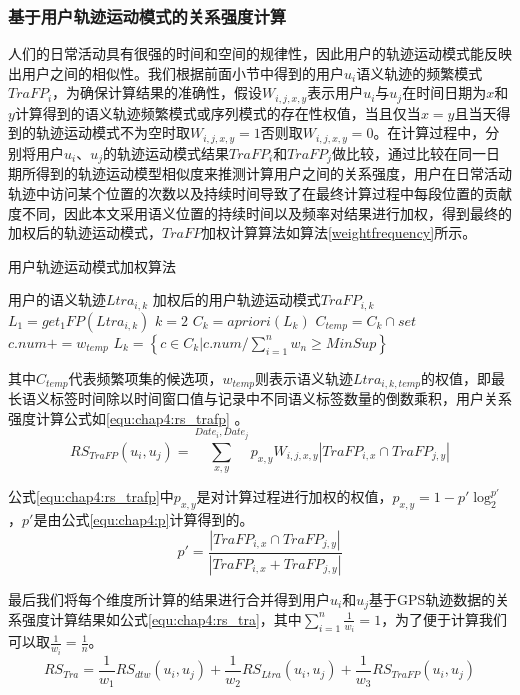 \subsubsection{基于用户轨迹运动模式的关系强度计算}
人们的日常活动具有很强的时间和空间的规律性，因此用户的轨迹运动模式能反映出用户之间的相似性。我们根据前面小节中得到的用户$u_{i}$语义轨迹的频繁模式$TraFP_{i}$，为确保计算结果的准确性，假设$W_{i,j,x,y}$表示用户$u_{i}$与$u_{j}$在时间日期为$x$和$y$计算得到的语义轨迹频繁模式或序列模式的存在性权值，当且仅当$x=y$且当天得到的轨迹运动模式不为空时取$W_{i,j,x,y}=1$否则取$W_{i,j,x,y}=0$。在计算过程中，分别将用户$u_{i}$、$u_{j}$的轨迹运动模式结果$TraFP_{i}$和$TraFP_{j}$做比较，通过比较在同一日期所得到的轨迹运动模型相似度来推测计算用户之间的关系强度，用户在日常活动轨迹中访问某个位置的次数以及持续时间导致了在最终计算过程中每段位置的贡献度不同，因此本文采用语义位置的持续时间以及频率对结果进行加权，得到最终的加权后的轨迹运动模式，$TraFP$加权计算算法如算法\ref{weightfrequency}所示。
\begin{algorithm}[H]
    \caption{用户轨迹运动模式加权算法}
    \label{weightfrequency}
    \begin{algorithmic}[1] %
    \REQUIRE 用户的语义轨迹$Ltra_{i,k}$
    \ENSURE 加权后的用户轨迹运动模式$TraFP_{i,k}$
    \STATE $L_{1}= get_{1}FP(Ltra_{i,k})$
    \STATE $k=2$
    \STATE $C_{k}=apriori(L_{k})$
    \STATE $C_{temp}=C_{k}\cap set$
    \STATE $c.num+=w_{temp}$
    \ENDFOR
    \ENDFOR	
    \STATE \mbox{{$L_{k} = \left \{   c\in C_{k}  |  c.num /\sum_{i=1}^{n}w_{n} \geq MinSup  \right \}$ }}
    \ENDWHILE
\end{algorithmic}
\end{algorithm}
\par 其中$C_{temp}$代表频繁项集的候选项，$w_{temp}$则表示语义轨迹$Ltra_{i,k,temp}$的权值，即最长语义标签时间除以时间窗口值与记录中不同语义标签数量的倒数乘积，用户关系强度计算公式如\ref{equ:chap4:rs_trafp} 。
\begin{equation}
\label{equ:chap4:rs_trafp}
RS_{TraFP}(u_{i},u_{j})=\sum_{x ,y }^{ Date_{i}, Date_{j}} p_{x,y} W_{i,j,x,y} \left |TraFP_{i,x} \cap TraFP_{j,y}   \right |
\end{equation}
\par 公式\ref{equ:chap4:rs_trafp}中$p_{x,y}$是对计算过程进行加权的权值，$p_{x,y}=1-{p}'\log_{2}^{{p}'}$，${p}'$是由公式\ref{equ:chap4:p}计算得到的。
\begin{equation}
\label{equ:chap4:p}
{p}'=\frac{\left |TraFP_{i,x} \cap TraFP_{j,y}   \right |}{\left |TraFP_{i,x} + TraFP_{j,y}   \right |}
\end{equation}
\par 最后我们将每个维度所计算的结果进行合并得到用户$u_{i}$和$u_{j}$基于GPS轨迹数据的关系强度计算结果如公式\ref{equ:chap4:rs_tra}，其中$ \sum_{i=1}^{n}\frac{1}{w_{i}}=1$，为了便于计算我们可以取$\frac{1}{w_{i}}=\frac{1}{n}$。
\begin{equation}
\label{equ:chap4:rs_tra}
RS_{Tra}=\frac{1}{w_{1}} RS_{dtw}(u_{i},u_{j})+\frac{1}{w_{2}}RS_{Ltra}(u_{i},u_{j})+\frac{1}{w_{3}}RS_{TraFP}(u_{i},u_{j})
\end{equation}
